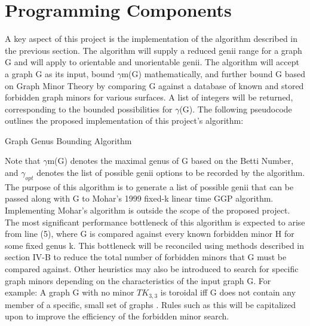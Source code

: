 \documentclass[12pt,conference]{IEEEtran}
\begin{document}
\section{Programming Components}

A key aspect of this project is the implementation of the algorithm described in the previous section. The algorithm will supply a reduced genii range for a graph G and will apply to orientable and unorientable genii. The algorithm will accept a graph G as its input, bound $\gamma$m(G) mathematically, and further bound G based on Graph Minor Theory by comparing G against a database of known and stored forbidden graph minors for various surfaces. A list of integers will be returned, corresponding to the bounded possibilities for $\gamma$(G). The following pseudocode outlines the proposed implementation of this project's algorithm:

\begin{algorithm}[H]
  \caption{Graph Genus Bounding Algorithm}
  \label{graph_genus_bound}
  \begin{algorithmic}[1]
  	\EndIf
  	\EndFor
  	\EndFor
  \end{algorithmic}
\end{algorithm}

Note that $\gamma$m(G) denotes the maximal genus of G based on the Betti Number, and $\gamma_{opt}$ denotes the list of possible genii options to be recorded by the algorithm. The purpose of this algorithm is to generate a list of possible genii that can be passed along with G to Mohar's 1999 fixed-k linear time GGP algorithm. Implementing Mohar's algorithm is outside the scope of the proposed project. The most significant performance bottleneck of this algorithm is expected to arise from line (5), where G is compared against every known forbidden minor H for some fixed genus k. This bottleneck will be reconciled using methods described in section IV-B to reduce the total number of forbidden minors that G must be compared against. Other heuristics may also be introduced to search for specific graph minors depending on the characteristics of the input graph G. For example: A graph G with no minor $TK_{3,3}$ is toroidal iff G does not contain any member of a specific, small set of graphs \cite{gagarin-myrvold}. Rules such as this will be capitalized upon to improve the efficiency of the forbidden minor search.
\end{document}

